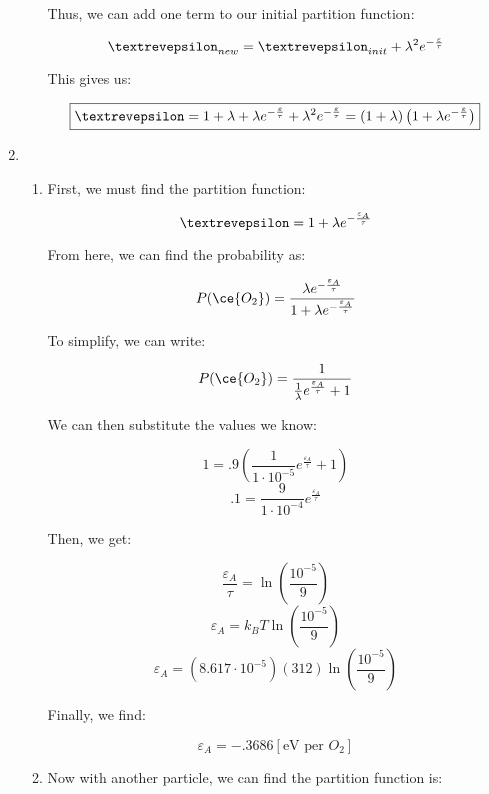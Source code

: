 \begin{enumerate}
\begin{enumerate}
        Thus, we can add one term to our initial partition function:

        $$\text{\textrevepsilon}_{new}=\text{\textrevepsilon}_{init}+\lambda^2e^{-\frac{\varepsilon}{\tau}}$$

        This gives us:

        $$\boxed{\text{\textrevepsilon}=1+\lambda+\lambda e^{-\frac{\varepsilon}{\tau}}+\lambda^2 e^{-\frac{\varepsilon}{\tau}}=(1+\lambda)\left(1+\lambda e^{-\frac{\varepsilon}{\tau}}\right)}$$

    \end{enumerate}

    \setcounter{enumi}{7}

  \item

    \begin{enumerate}

      \item 

        First, we must find the partition function:

        $$\text{\textrevepsilon}=1+\lambda e^{-\frac{\varepsilon_A}{\tau}}$$

        From here, we can find the probability as:

        $$P(\ce{O_2})=\frac{\lambda e^{-\frac{\varepsilon_A}{\tau}}}{1+\lambda e^{-\frac{\varepsilon_A}{\tau}}}$$

        To simplify, we can write:

        $$P(\ce{O_2})=\frac{1}{\frac{1}{\lambda}e^{\frac{\varepsilon_A}{\tau}}+1}$$

        We can then substitute the values we know:

        $$1=.9\left( \frac{1}{1\cdot10^{-5}}e^{\frac{\varepsilon_A}{\tau}}+1 \right)$$
        $$.1=\frac{9}{1\cdot10^{-4}}e^{\frac{\varepsilon_A}{\tau}}$$

        Then, we get:

        $$\frac{\varepsilon_A}{\tau}=\ln\left( \frac{10^{-5}}{9} \right)$$
        $$\varepsilon_A=k_B T\ln\left( \frac{10^{-5}}{9} \right)$$
        $$\varepsilon_A=\left( 8.617\cdot10^{-5} \right)(312)\ln\left( \frac{10^{-5}}{9} \right)$$

        Finally, we find:

        $$\boxed{\varepsilon_A=-.3686\left[ \si{\eV}\text{ per }O_2 \right]}$$

      \item 

        Now with another particle, we can find the partition function is:


\end{enumerate}
\end{enumerate}

